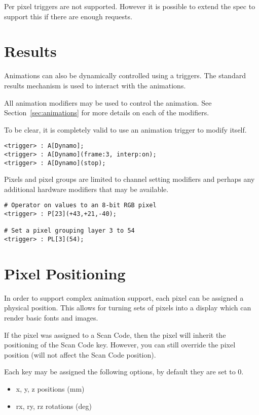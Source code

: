 \documentclass{kiibohd-template}
\begin{document}
Per pixel triggers are not supported.
However it is possible to extend the spec to support this if there are enough requests.


\section{Results}

Animations can also be dynamically controlled using a triggers.
The standard results mechanism is used to interact with the animations.

All animation modifiers may be used to control the animation.
See Section~\ref{sec:animations} for more details on each of the modifiers.

To be clear, it is completely valid to use an animation trigger to modify itself.

\begin{lstlisting}
<trigger> : A[Dynamo];
<trigger> : A[Dynamo](frame:3, interp:on);
<trigger> : A[Dynamo](stop);
\end{lstlisting}

Pixels and pixel groups are limited to channel setting modifiers and perhaps any additional hardware modifiers that may be available.

\begin{lstlisting}
# Operator on values to an 8-bit RGB pixel
<trigger> : P[23](+43,+21,-40);

# Set a pixel grouping layer 3 to 54
<trigger> : PL[3](54);
\end{lstlisting}


\section{Pixel Positioning}

In order to support complex animation support, each pixel can be assigned a physical position.
This allows for turning sets of pixels into a display which can render basic fonts and images.

If the pixel was assigned to a Scan Code, then the pixel will inherit the positioning of the Scan Code key.
However, you can still override the pixel position (will not affect the Scan Code position).

Each key may be assigned the following options, by default they are set to 0.

\begin{itemize}
\item x, y, z positions (mm)
\item rx, ry, rz rotations (deg)
\end{itemize}
\end{document}
